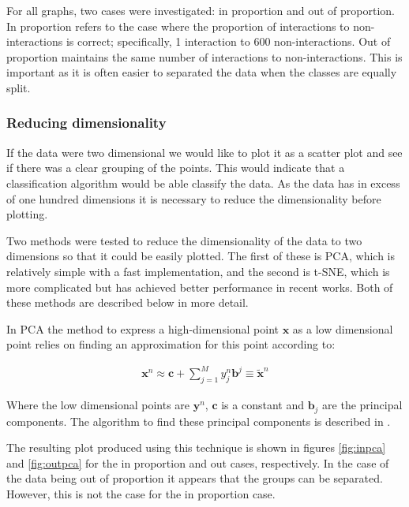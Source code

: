 For all graphs, two cases were investigated: in proportion and out of proportion.
In proportion refers to the case where the proportion of interactions to non-interactions is correct; specifically, 1 interaction to 600 non-interactions.
Out of proportion maintains the same number of interactions to non-interactions.
This is important as it is often easier to separated the data when the classes are equally split.

\subsubsection{Reducing dimensionality}
If the data were two dimensional we would like to plot it as a scatter plot and see if there was a clear grouping of the points.
This would indicate that a classification algorithm would be able classify the data.
As the data has in excess of one hundred dimensions it is necessary to reduce the dimensionality before plotting.

Two methods were tested to reduce the dimensionality of the data to two dimensions so that it could be easily plotted.
The first of these is PCA, which is relatively simple with a fast implementation, and the second is t-SNE, which is more complicated but has achieved better performance in recent works.
Both of these methods are described below in more detail.

In PCA the method to express a high-dimensional point $\pmb{x}$ as a low dimensional point relies on finding an approximation for this point according to\autocite[330]{barber_bayesian_2013}:

\begin{align}
    \pmb{x}^{n} \approx \pmb{c} + \sum_{j=1}^{M} y_{j}^{n} \pmb{b}^{j} \equiv \tilde{\pmb{x}}^{n}
\end{align}

Where the low dimensional points are $\pmb{y}^{n}$, $\pmb{c}$ is a constant and $\pmb{b}_{j}$ are the principal components.
The algorithm to find these principal components is described in \textcite[333]{barber_bayesian_2013}.

The resulting plot produced using this technique is shown in figures \ref{fig:inpca} and \ref{fig:outpca} for the in proportion and out cases, respectively.
In the case of the data being out of proportion it appears that the groups can be separated.
However, this is not the case for the in proportion case.

